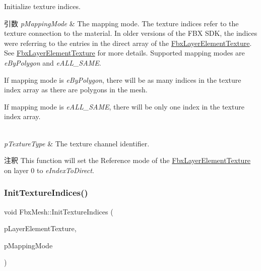 Initialize texture indices. 
\begin{DoxyParams}{引数}
{\em p\+Mapping\+Mode} & The mapping mode. The texture indices refer to the texture connection to the material. In older versions of the F\+BX S\+DK, the indices were referring to the entries in the direct array of the \hyperlink{class_fbx_layer_element_texture}{Fbx\+Layer\+Element\+Texture}. See \hyperlink{class_fbx_layer_element_texture}{Fbx\+Layer\+Element\+Texture} for more details. Supported mapping modes are {\itshape e\+By\+Polygon} and {\itshape e\+A\+L\+L\+\_\+\+S\+A\+ME}.
\begin{DoxyItemize}
\item If mapping mode is {\itshape e\+By\+Polygon}, there will be as many indices in the texture index array as there are polygons in the mesh.
\item If mapping mode is {\itshape e\+A\+L\+L\+\_\+\+S\+A\+ME}, there will be only one index in the texture index array. 
\end{DoxyItemize}\\
\hline
{\em p\+Texture\+Type} & The texture channel identifier. \\
\hline
\end{DoxyParams}
\begin{DoxyRemark}{注釈}
This function will set the Reference mode of the \hyperlink{class_fbx_layer_element_texture}{Fbx\+Layer\+Element\+Texture} on layer 0 to {\itshape e\+Index\+To\+Direct}. 
\end{DoxyRemark}
\mbox{\label{class_fbx_mesh_a79732f5b5d10581887b78877cd67b003}} 
\subsubsection{\texorpdfstring{Init\+Texture\+Indices()}{InitTextureIndices()}\hspace{0.1cm}{\footnotesize\ttfamily [2/2]}}
{\footnotesize\ttfamily void Fbx\+Mesh\+::\+Init\+Texture\+Indices (\begin{DoxyParamCaption}\item[{\hyperlink{class_fbx_layer_element_texture}{Fbx\+Layer\+Element\+Texture} $\ast$}]{p\+Layer\+Element\+Texture,  }\item[{\hyperlink{class_fbx_layer_element_a5a40e95db30ae9f94611dc3f1568af26}{Fbx\+Layer\+Element\+::\+E\+Mapping\+Mode}}]{p\+Mapping\+Mode }\end{DoxyParamCaption})\hspace{0.3cm}{\ttfamily [protected]}}

